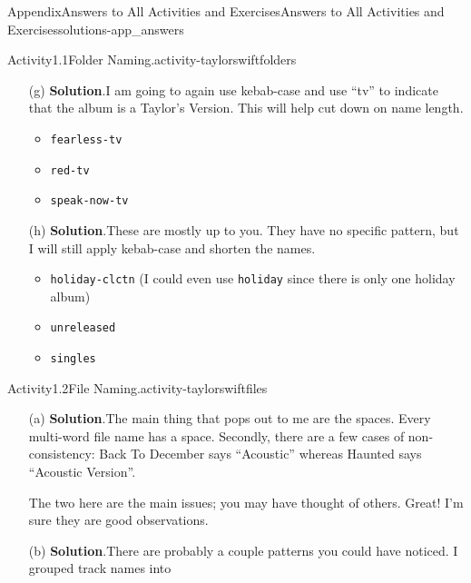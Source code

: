 \documentclass[twoside,10pt,]{book}
\newcommand{\blocktitlefont}{\relax}
\newcommand{\mono}[1]{\texttt{#1}}
\begin{document}
\begin{solutions-chapter}{Appendix}{Answers to All Activities and Exercises}{}{Answers to All Activities and Exercises}{}{}{solutions-app_answers}
\begin{activitysolution}{Activity}{1.1}{Folder Naming.}{activity-taylorswiftfolders}
\begin{enumerate}[font=\bfseries,label=(\alph*),ref=\alph*]
\begin{itemize}[label=\textbullet]
\item{}\mono{clear-chnl-live}%
\item{}\mono{speak-now-live}%
\end{itemize}
%
\item[(g)]\noindent\textbf{\blocktitlefont Solution}.\hypertarget{solution-taylorswiftfolders-j-b-back}{}\quad{}I am going to again use kebab-case and use ``tv'' to indicate that the album is a Taylor's Version. This will help cut down on name length.%
\begin{itemize}[label=\textbullet]
\item{}\mono{fearless-tv}%
\item{}\mono{red-tv}%
\item{}\mono{speak-now-tv}%
\end{itemize}
%
\item[(h)]\noindent\textbf{\blocktitlefont Solution}.\hypertarget{solution-taylorswiftfolders-k-b-back}{}\quad{}These are mostly up to you. They have no specific pattern, but I will still apply kebab-case and shorten the names.%
\begin{itemize}[label=\textbullet]
\item{}\mono{holiday-clctn} (I could even use \mono{holiday} since there is only one holiday album)%
\item{}\mono{unreleased}%
\item{}\mono{singles}%
\end{itemize}
%
\end{enumerate}%
\end{activitysolution}%
\begin{activitysolution}{Activity}{1.2}{File Naming.}{activity-taylorswiftfiles}%
\begin{enumerate}[font=\bfseries,label=(\alph*),ref=\alph*]%
\item[(a)]\noindent\textbf{\blocktitlefont Solution}.\hypertarget{solution-taylorswiftfiles-d-b-back}{}\quad{}The main thing that pops out to me are the spaces. Every multi-word file name has a space. Secondly, there are a few cases of non-consistency: Back To December says ``Acoustic'' whereas Haunted says ``Acoustic Version''.%
\par
The two here are the main issues; you may have thought of others. Great! I'm sure they are good observations.%
\item[(b)]\noindent\textbf{\blocktitlefont Solution}.\hypertarget{solution-taylorswiftgroups2-b-back}{}\quad{}There are probably a couple patterns you could have noticed. I grouped track names into%

\end{enumerate}
\end{activitysolution}
\end{solutions-chapter}
\end{document}
